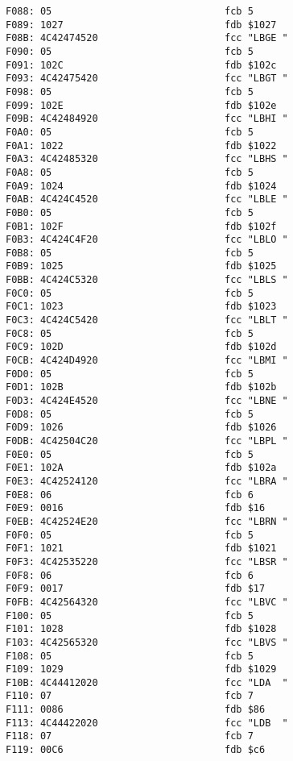 {\begin{verbatim}
F088: 05                              fcb 5
F089: 1027                            fdb $1027
F08B: 4C42474520                      fcc "LBGE "
F090: 05                              fcb 5
F091: 102C                            fdb $102c
F093: 4C42475420                      fcc "LBGT "
F098: 05                              fcb 5
F099: 102E                            fdb $102e
F09B: 4C42484920                      fcc "LBHI "
F0A0: 05                              fcb 5
F0A1: 1022                            fdb $1022
F0A3: 4C42485320                      fcc "LBHS "
F0A8: 05                              fcb 5
F0A9: 1024                            fdb $1024
F0AB: 4C424C4520                      fcc "LBLE "
F0B0: 05                              fcb 5
F0B1: 102F                            fdb $102f
F0B3: 4C424C4F20                      fcc "LBLO "
F0B8: 05                              fcb 5
F0B9: 1025                            fdb $1025
F0BB: 4C424C5320                      fcc "LBLS "
F0C0: 05                              fcb 5
F0C1: 1023                            fdb $1023
F0C3: 4C424C5420                      fcc "LBLT "
F0C8: 05                              fcb 5
F0C9: 102D                            fdb $102d
F0CB: 4C424D4920                      fcc "LBMI "
F0D0: 05                              fcb 5
F0D1: 102B                            fdb $102b
F0D3: 4C424E4520                      fcc "LBNE "
F0D8: 05                              fcb 5
F0D9: 1026                            fdb $1026
F0DB: 4C42504C20                      fcc "LBPL "
F0E0: 05                              fcb 5
F0E1: 102A                            fdb $102a
F0E3: 4C42524120                      fcc "LBRA "
F0E8: 06                              fcb 6
F0E9: 0016                            fdb $16
F0EB: 4C42524E20                      fcc "LBRN "
F0F0: 05                              fcb 5
F0F1: 1021                            fdb $1021
F0F3: 4C42535220                      fcc "LBSR "
F0F8: 06                              fcb 6
F0F9: 0017                            fdb $17
F0FB: 4C42564320                      fcc "LBVC "
F100: 05                              fcb 5
F101: 1028                            fdb $1028
F103: 4C42565320                      fcc "LBVS "
F108: 05                              fcb 5
F109: 1029                            fdb $1029
F10B: 4C44412020                      fcc "LDA  "
F110: 07                              fcb 7
F111: 0086                            fdb $86
F113: 4C44422020                      fcc "LDB  "
F118: 07                              fcb 7
F119: 00C6                            fdb $c6

\end{verbatim}}
